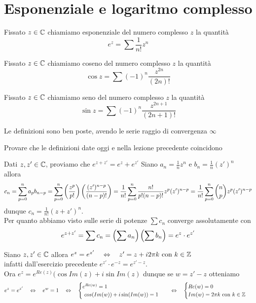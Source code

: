 \section{Esponenziale e logaritmo complesso }
\begin{defn}Fissato $z\in \mathbb{C}$ chiamiamo esponenziale del numero complesso $z$ la quantit\`a
$$e^z = \sum \frac{1}{n!}z^n$$
\end{defn}
\begin{defn}
Fissato $z\in \mathbb{C}$ chiamiamo coseno del numero complesso $z$ la quantit\`a
$$\cos z  = \sum (-1)^n \frac{z^{2n}}{(2n)!}$$
\end{defn}
\begin{defn}
Fissato $z\in \mathbb{C}$ chiamiamo seno  del numero complesso $z$ la quantit\`a
$$\sin z  = \sum (-1)^n \frac{z^{2n+1}}{(2n+1)!}$$
\end{defn}
\begin{oss}Le definizioni sono ben poste, avendo le serie raggio di convergenza $\infty$
\end{oss}
\begin{ex}Provare che le definizioni date oggi e nella lezione precedente coincidono
\end{ex}
\begin{ese}Dati $z,z'\in \mathbb{C}$, proviamo che $e^{z+z'}=e^z+e^{z'}$
\proof
Siano $a_n =\frac{1}{n}z^n$ e $b_n =\frac{1}{n}(z')^n$ allora 
$$c_n=\sum_{p=0}^n a_p b_{n-p} = \sum_{p=0}^n \left( \frac{z^p}{p!}\right)\left( \frac{(z')^{n-p}}{(n-p)!} \right) = \frac{1}{n!} \sum_{p=0}^n \frac{n!}{p! (n-p)!} z^p (z')^{n-p}  =\frac{1}{n!} \sum_{p=0}^n { n \choose p} z^p (z')^{n-p}$$ 
dunque 
$c_n= \frac{1}{n!}(z+z')^n$.\\
Per quanto abbiamo visto sulle serie di potenze $\sum c_n$ converge assolutamente con 
$$e^{z+z'} = \sum c_n = \left( \sum a_n \right) \left( \sum b_n \right) = e^z\cdot e^{z'}$$
\endproof
\end{ese}
\begin{oss}Siano $z,z' \in \mathbb{C}$ allora 
$e^z =e^{z'} \quad \Leftrightarrow \quad z'=z+i 2\pi k \text{ con } k \in \mathbb{Z}$\\
infatti dall'esercizio precedente $e^{z'} \cdot e^{-z}=e^{z'-z}$.\\
Ora $e^z=e^{Re(z)}( \cos Im (z) + i \sin Im (z)$ dunque se $w=z'-z$ otteniamo 
$$e^z =e^{z'} \quad \Leftrightarrow \quad e^{w}=1 \quad \Leftrightarrow \quad \begin{cases} e^{Re(w)}=1  \\
\ cos (Im(w)) +i\sin (Im(w))=1 \end{cases} 
\quad \Leftrightarrow \quad \begin{cases} Re(w)=0 \\ Im(w)=2\pi k \text{ con } k \in \mathbb{Z} 
\end{cases}$$
\end{oss}
